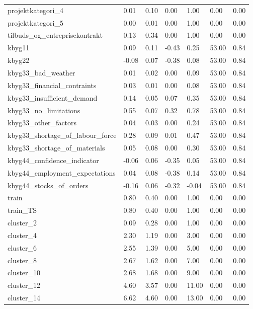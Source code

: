 \begin{landscape}
\begin{longtable}[h!]{lllllll}
projektkategori_4 & 0.01 & 0.10 & 0.00 & 1.00 & 0.00 & 0.00 \\
projektkategori_5 & 0.00 & 0.01 & 0.00 & 1.00 & 0.00 & 0.00 \\
tilbuds_og_entreprisekontrakt & 0.13 & 0.34 & 0.00 & 1.00 & 0.00 & 0.00 \\
kbyg11 & 0.09 & 0.11 & -0.43 & 0.25 & 53.00 & 0.84 \\
kbyg22 & -0.08 & 0.07 & -0.38 & 0.08 & 53.00 & 0.84 \\
kbyg33_bad_weather & 0.01 & 0.02 & 0.00 & 0.09 & 53.00 & 0.84 \\
kbyg33_financial_contraints & 0.03 & 0.01 & 0.00 & 0.08 & 53.00 & 0.84 \\
kbyg33_insufficient_demand & 0.14 & 0.05 & 0.07 & 0.35 & 53.00 & 0.84 \\
kbyg33_no_limitations & 0.55 & 0.07 & 0.32 & 0.78 & 53.00 & 0.84 \\
kbyg33_other_factors & 0.04 & 0.03 & 0.00 & 0.24 & 53.00 & 0.84 \\
kbyg33_shortage_of_labour_force & 0.28 & 0.09 & 0.01 & 0.47 & 53.00 & 0.84 \\
kbyg33_shortage_of_materials & 0.05 & 0.08 & 0.00 & 0.30 & 53.00 & 0.84 \\
kbyg44_confidence_indicator & -0.06 & 0.06 & -0.35 & 0.05 & 53.00 & 0.84 \\
kbyg44_employment_expectations & 0.04 & 0.08 & -0.38 & 0.14 & 53.00 & 0.84 \\
kbyg44_stocks_of_orders & -0.16 & 0.06 & -0.32 & -0.04 & 53.00 & 0.84 \\
train & 0.80 & 0.40 & 0.00 & 1.00 & 0.00 & 0.00 \\
train_TS & 0.80 & 0.40 & 0.00 & 1.00 & 0.00 & 0.00 \\
cluster_2 & 0.09 & 0.28 & 0.00 & 1.00 & 0.00 & 0.00 \\
cluster_4 & 2.30 & 1.19 & 0.00 & 3.00 & 0.00 & 0.00 \\
cluster_6 & 2.55 & 1.39 & 0.00 & 5.00 & 0.00 & 0.00 \\
cluster_8 & 2.67 & 1.62 & 0.00 & 7.00 & 0.00 & 0.00 \\
cluster_10 & 2.68 & 1.68 & 0.00 & 9.00 & 0.00 & 0.00 \\
cluster_12 & 4.60 & 3.57 & 0.00 & 11.00 & 0.00 & 0.00 \\
cluster_14 & 6.62 & 4.60 & 0.00 & 13.00 & 0.00 & 0.00 \\
\end{longtable}\end{landscape}
